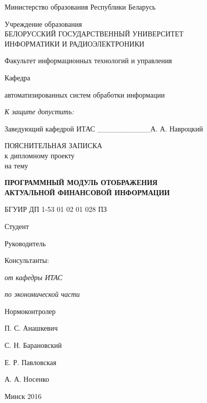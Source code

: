 \thispagestyle{empty}
\setlength{\parindent}{0ex} %

{\centering{}
  Министерство образования Республики Беларусь\par
}

\bigskip
{\centering{}
  Учреждение образования \\
  БЕЛОРУССКИЙ ГОСУДАРСТВЕННЫЙ УНИВЕРСИТЕТ \\
  ИНФОРМАТИКИ И РАДИОЭЛЕКТРОНИКИ
  \par
}

\bigskip
Факультет информационных технологий и управления

\smallskip
\parbox{\widthof{Факультет}}{Кафедра}
автоматизированных систем обработки информации

\vspace{\baselineskip}
\hfill
\begin{minipage}{.4\textwidth}
  {\raggedright{}
    \textit{К защите допустить:}

    \smallskip
    Заведующий кафедрой ИТАС
    \_\_\_\_\_\_\_\_\_\_А. А. Навроцкий\par
  }
\end{minipage}

\vspace{3\baselineskip}

{\centering{}
  ПОЯСНИТЕЛЬНАЯ ЗАПИСКА \\
  к дипломному проекту \\
  на тему\par
}

\bigskip
{\centering{}
  \textbf{ПРОГРАММНЫЙ МОДУЛЬ ОТОБРАЖЕНИЯ \\ АКТУАЛЬНОЙ ФИНАНСОВОЙ ИНФОРМАЦИИ}\par
}

\bigskip
{\centering{}
  БГУИР ДП 1-53 01 02 01 028 ПЗ \par
}

\vspace{5\baselineskip}

\begin{minipage}{.6\textwidth}
Студент

Руководитель

Консультанты:

\hspace{0.3em} \textit{от кафедры ИТАС}

\hspace{0.3em} \textit{по экономической части}

Нормоконтролер

\smallskip
\color{white}{Рецензент}
\end{minipage}
\hfill
\begin{minipage}{.3\textwidth}
  П. С. Анашкевич

  С. Н. Барановский

  \vspace{\baselineskip}
  Е. Р. Павловская

  А. А. Носенко

  \color{black}{Е. В. Протченко}

  \smallskip

  \color{white}{???}
\end{minipage}

\vfill

{\centering{}
  Минск 2016\par
}

\setlength{\parindent}{1.25cm} %
